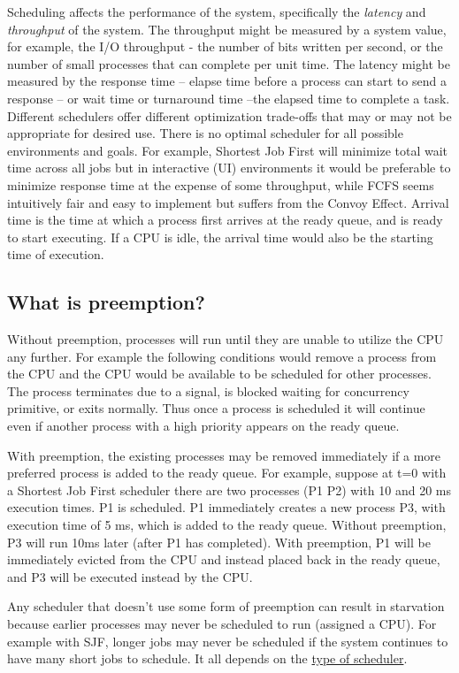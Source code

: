 Scheduling affects the performance of the system, specifically the \emph{latency} and \emph{throughput} of the system.
The throughput might be measured by a system value, for example, the I/O throughput - the number of bits written per second, or the number of small processes that can complete per unit time.
The latency might be measured by the response time -- elapse time before a process can start to send a response -- or wait time or turnaround time --the elapsed time to complete a task.
Different schedulers offer different optimization trade-offs that may or may not be appropriate for desired use.
There is no optimal scheduler for all possible environments and goals.
For example, Shortest Job First will minimize total wait time across all jobs but in interactive (UI) environments it would be preferable to minimize response time at the expense of some throughput, while FCFS seems intuitively fair and easy to implement but suffers from the Convoy Effect.
Arrival time is the time at which a process first arrives at the ready queue, and is ready to start executing.
If a CPU is idle, the arrival time would also be the starting time of execution.

\subsection{What is preemption?}

Without preemption, processes will run until they are unable to utilize the CPU any further.
For example the following conditions would remove a process from the CPU and the CPU would be available to be scheduled for other processes.
The process terminates due to a signal, is blocked waiting for concurrency primitive, or exits normally.
Thus once a process is scheduled it will continue even if another process with a high priority appears on the ready queue.

With preemption, the existing processes may be removed immediately if a more preferred process is added to the ready queue.
For example, suppose at t=0 with a Shortest Job First scheduler there are two processes (P1 P2) with 10 and 20 ms execution times.
P1 is scheduled.
P1 immediately creates a new process P3, with execution time of 5 ms, which is added to the ready queue.
Without preemption, P3 will run 10ms later (after P1 has completed).
With preemption, P1 will be immediately evicted from the CPU and instead placed back in the ready queue, and P3 will be executed instead by the CPU.

Any scheduler that doesn't use some form of preemption can result in starvation because earlier processes may never be scheduled to run (assigned a CPU).
For example with SJF, longer jobs may never be scheduled if the system continues to have many short jobs to schedule.
It all depends on the \href{https://en.wikipedia.org/wiki/Scheduling_(computing)\#Types_of_operating_system_schedulers}{type of scheduler}.

